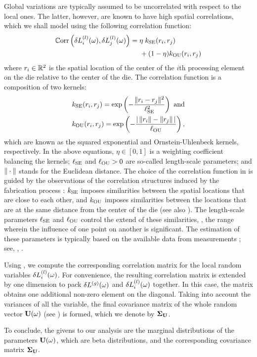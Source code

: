 Global variations are typically assumed to be uncorrelated with respect to the local ones.
The latter, however, are known to have high spatial correlations, which we shall model using the following correlation function:
\begin{align}
  \oCorr{\lLeff_i(\o), \lLeff_j(\o)} \elabel{correlation-function} &= \eta \; \fCorr_\SE(\r_i, \r_j) \\
  & { } \;\;\;\;\; + (1 - \eta) \fCorr_\OU(\r_i, \r_j) \nonumber
\end{align}
where $r_i \in \mathbb{R}^2$ is the spatial location of the center of the $i$th processing element on the die relative to the center of the die. The correlation function is a composition of two kernels:
\begin{align*}
  & \fCorr_\SE(\r_i, \r_j) = \exp\left(-\frac{\norm{\r_i - \r_j}^2}{\ell_\SE^2}\right) \text{ and} \\
  & \fCorr_\OU(\r_i, \r_j) = \exp\left(- \frac{\abs{\,\norm{\r_i} - \norm{\r_j}\,}}{\ell_\OU} \right),
\end{align*}
which are known as the squared exponential and Ornstein-Uhlenbeck kernels, respectively.
In the above equations, $\eta \in [0, 1]$ is a weighting coefficient balancing the kernels; $\ell_{\text{SE}}$ and $\ell_{\text{OU}} > 0$ are so-called length-scale parameters; and $\| \cdot \|$ stands for the Euclidean distance.
The choice of the correlation function in  is guided by the observations of the correlation structures induced by the fabrication process \cite{chandrakasan2001, friedberg2005, cheng2011}: $\fCorr_\SE$ imposes similarities between the spatial locations that are close to each other, and $\fCorr_\OU$ imposes similarities between the locations that are at the same distance from the center of the die (see also \cite{ghanem1991, ghanta2006}).
The length-scale parameters $\ell_{\text{SE}}$ and $\ell_{\text{OU}}$ control the extend of these similarities, \ie, the range wherein the influence of one point on another is significant. The estimation of these parameters is typically based on the available data from measurements \cite{ghanta2006}; see, \eg, \cite{friedberg2005}.

Using , we compute the corresponding correlation matrix for the local random variables $\delta L^{(l)}_i(\omega)$.
For convenience, the resulting correlation matrix is extended by one dimension to pack ${\delta L^{(g)}}(\omega)$ and $\delta L^{(l)}_i(\omega)$ together.
In this case, the matrix obtains one additional non-zero element on the diagonal.
Taking into account the variances of all the variable, the final covariance matrix of the whole random vector $\mathbf{U}(\omega)$ (see ) is formed, which we denote by $\mCov_\vU$.

To conclude, the givens to our analysis are the marginal distributions of the parameters $\mathbf{U}(\omega)$, which are beta distributions, and the corresponding covariance matrix $\mCov_\vU$.

